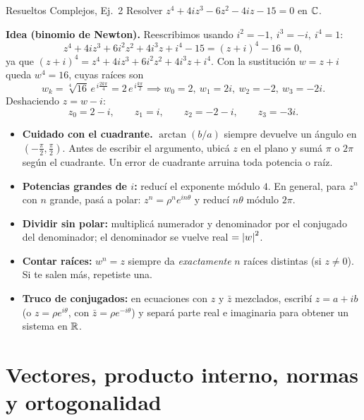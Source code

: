 \begin{ejemplo}{Resueltos Complejos, Ej.\ 2}
Resolver $z^4 + 4iz^3 - 6z^2 - 4iz - 15 = 0$ en $\mathbb{C}$.

\smallskip
\textbf{Idea (binomio de Newton).} Reescribimos usando $i^2=-1,\ i^3=-i,\ i^4=1$:
\[
z^4 + 4iz^3 + 6i^2 z^2 + 4i^3 z + i^4 - 15 = (z+i)^4 - 16 = 0,
\]
ya que $(z+i)^4 = z^4 + 4iz^3 + 6i^2z^2 + 4i^3z + i^4$. Con la sustitución $w = z+i$ queda $w^4 = 16$, cuyas raíces son
\[
w_k = \sqrt[4]{16}\,e^{\,i\frac{2k\pi}{4}} = 2\,e^{\,i\frac{k\pi}{2}} \implies w_0=2,\ w_1=2i,\ w_2=-2,\ w_3=-2i.
\]
Deshaciendo $z = w - i$:
\[
z_0 = 2 - i, \qquad z_1 = i, \qquad z_2 = -2 - i, \qquad z_3 = -3i.
\]
\end{ejemplo}

\begin{truco}
\begin{itemize}
  \item \textbf{Cuidado con el cuadrante.} $\arctan(b/a)$ siempre devuelve un ángulo en $\left(-\tfrac{\pi}{2}, \tfrac{\pi}{2}\right)$. Antes de escribir el argumento, ubicá $z$ en el plano y sumá $\pi$ o $2\pi$ según el cuadrante. Un error de cuadrante arruina toda potencia o raíz.
  \item \textbf{Potencias grandes de $i$:} reducí el exponente módulo $4$. En general, para $z^{n}$ con $n$ grande, pasá a polar: $z^n = \rho^n e^{i n\theta}$ y reducí $n\theta$ módulo $2\pi$.
  \item \textbf{Dividir sin polar:} multiplicá numerador y denominador por el conjugado del denominador; el denominador se vuelve real $= \left\lvert w \right\rvert^2$.
  \item \textbf{Contar raíces:} $w^n = z$ siempre da \emph{exactamente} $n$ raíces distintas (si $z\neq0$). Si te salen más, repetiste una.
  \item \textbf{Truco de conjugados:} en ecuaciones con $z$ y $\bar z$ mezclados, escribí $z = a+ib$ (o $z=\rho e^{i\theta}$, con $\bar z = \rho e^{-i\theta}$) y separá parte real e imaginaria para obtener un sistema en $\mathbb{R}$.
\end{itemize}
\end{truco}

\section{Vectores, producto interno, normas y ortogonalidad}

